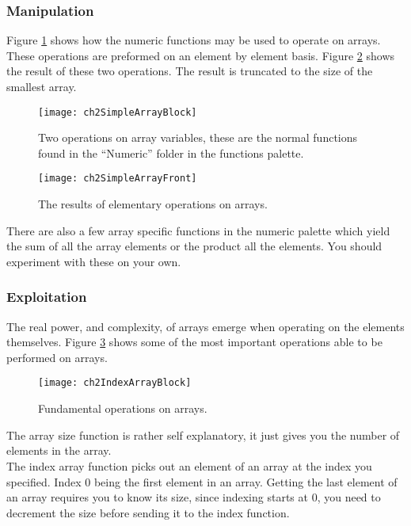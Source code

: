 \subsubsection{Manipulation}
Figure \ref{ch2SimpleArrayBlock} shows how the numeric functions may be used to operate on arrays. These operations are preformed on an element by element basis. Figure \ref{ch2SimpleArrayFront} shows the result of these two operations. The result is truncated to the size of the smallest array.\\
\begin{figure}
	\centering
	\texttt{[image: ch2SimpleArrayBlock]}
	\caption{Two operations on array variables, these are the normal functions found in the ``Numeric'' folder in the functions palette.}
	\label{ch2SimpleArrayBlock}
\end{figure}
\begin{figure}
	\centering
	\texttt{[image: ch2SimpleArrayFront]}
	\caption{The results of elementary operations on arrays.}
	\label{ch2SimpleArrayFront}
\end{figure}

There are also a few array specific functions in the numeric palette which yield the sum of all the array elements or the product all the elements. You should experiment with these on your own.\\

\subsubsection{Exploitation}
The real power, and complexity, of arrays emerge when operating on the elements themselves. Figure \ref{ch2IndexArrayBlock} shows some of the most important operations able to be performed on arrays.\\
\begin{figure}
	\centering
	\texttt{[image: ch2IndexArrayBlock]}
	\caption{Fundamental operations on arrays.}
	\label{ch2IndexArrayBlock}
\end{figure}

The array size function is rather self explanatory, it just gives you the number of elements in the array.\\

The index array function picks out an element of an array at the index you specified. Index $0$ being the first element in an array. Getting the last element of an array requires you to know its size, since indexing starts at $0$, you need to decrement the size before sending it to the index function.\\

